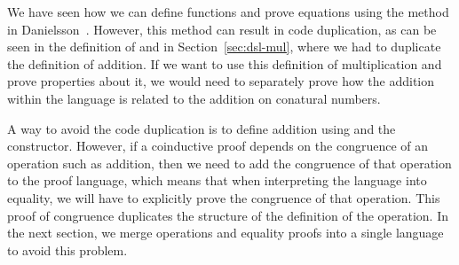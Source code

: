 We have seen how we can define functions and prove equations using the method in
Danielsson~\cite{danielsson-beating}. However, this method can result in code
duplication, as can be seen in the definition of  and
 in Section~\ref{sec:dsl-mul}, where we had to
duplicate the definition of addition. If we want to use this definition of
multiplication and prove properties about it, we would need to separately prove
how the addition within the language is related to the addition on conatural
numbers.

A way to avoid the code duplication is to define addition using
 and the  constructor.
However, if a coinductive proof depends on the congruence of an operation such
as addition, then we need to add the congruence of that operation to the proof
language, which means that when interpreting the language into equality, we will
have to explicitly prove the congruence of that operation. This proof of
congruence duplicates the structure of the definition of the operation. In the
next section, we merge operations and equality proofs into a single language to
avoid this problem.

